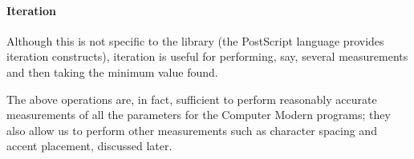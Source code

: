 \paragraph{Iteration} Although this is not specific to the library (the
PostScript language provides iteration constructs), iteration is useful for
performing, say, several measurements and then taking the minimum value found.

The above operations are, in fact, sufficient to perform reasonably accurate
measurements of all the parameters for the Computer Modern programs; they also
allow us to perform other measurements such as character spacing and accent
placement, discussed later.
